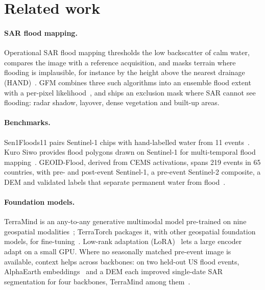 \documentclass[10pt,twocolumn,a4paper]{article}
\begin{document}
\section{Related work}

\paragraph{SAR flood mapping.} Operational SAR flood mapping thresholds the low backscatter of calm water, compares the
image with a reference acquisition, and masks terrain where flooding is implausible, for instance by the height above
the nearest drainage (HAND)~\citep{nobre2011hand}. GFM combines three such algorithms into an ensemble flood extent
with a per-pixel likelihood~\citep{salamon2021gfm,krullikowski2023gfm}, and ships an exclusion mask where SAR cannot
see flooding: radar shadow, layover, dense vegetation and built-up areas.

\paragraph{Benchmarks.} Sen1Floods11 pairs Sentinel-1 chips with hand-labelled water from 11
events~\citep{bonafilia2020sen1floods11}. Kuro Siwo provides flood polygons drawn on Sentinel-1 for multi-temporal
flood mapping~\citep{bountos2024kurosiwo}. GEOID-Flood, derived from CEMS activations, spans 219 events in 65
countries, with pre- and post-event Sentinel-1, a pre-event Sentinel-2 composite, a DEM and validated labels that
separate permanent water from flood~\citep{chiriaco2026geoid}.

\paragraph{Foundation models.} TerraMind is an any-to-any generative multimodal model pre-trained on nine geospatial
modalities~\citep{jakubik2025terramind}; TerraTorch packages it, with other geospatial foundation models, for
fine-tuning~\citep{gomes2025terratorch}. Low-rank adaptation (LoRA)~\citep{hu2021lora} lets a large encoder adapt on
a small GPU. Where no seasonally matched pre-event image is available, context helps across backbones: on two
held-out US flood events, AlphaEarth embeddings~\citep{brown2025alphaearth} and a DEM each improved single-date SAR
segmentation for four backbones, TerraMind among them~\citep{thasma2026alphaearth}.
\end{document}
